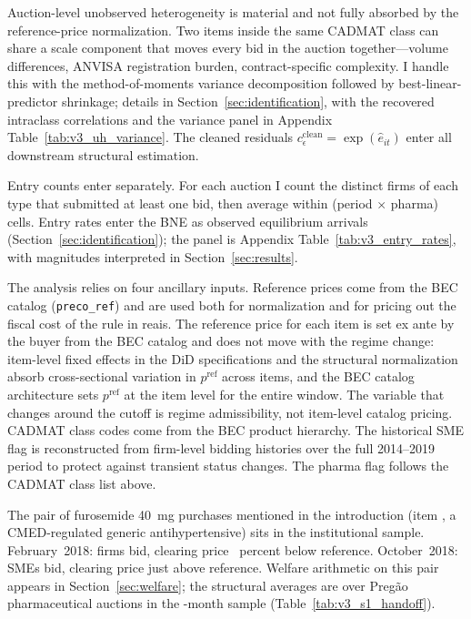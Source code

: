 Auction-level unobserved heterogeneity is material and not fully absorbed by the reference-price normalization. Two items inside the same CADMAT class can share a scale component that moves every bid in the auction together---volume differences, ANVISA registration burden, contract-specific complexity. I handle this with the \citet{krasnokutskaya2011} method-of-moments variance decomposition followed by best-linear-predictor shrinkage; details in Section~\ref{sec:identification}, with the recovered intraclass correlations and the variance panel in Appendix Table~\ref{tab:v3_uh_variance}. The cleaned residuals $c_\epsilon^{\text{clean}} = \exp(\hat e_{it})$ enter all downstream structural estimation.

Entry counts enter separately. For each auction I count the distinct firms of each type that submitted at least one bid, then average within (period $\times$ pharma) cells. Entry rates enter the BNE as observed equilibrium arrivals (Section~\ref{sec:identification}); the panel is Appendix Table~\ref{tab:v3_entry_rates}, with magnitudes interpreted in Section~\ref{sec:results}.

The analysis relies on four ancillary inputs. Reference prices come from the BEC catalog (\texttt{preco\_ref}) and are used both for normalization and for pricing out the fiscal cost of the rule in reais. The reference price for each item is set ex ante by the buyer from the BEC catalog and does not move with the regime change: item-level fixed effects in the DiD specifications and the structural normalization absorb cross-sectional variation in $p^{\mathrm{ref}}$ across items, and the BEC catalog architecture sets $p^{\mathrm{ref}}$ at the item level for the entire window. The variable that changes around the cutoff is regime admissibility, not item-level catalog pricing. CADMAT class codes come from the BEC product hierarchy. The historical SME flag is reconstructed from firm-level bidding histories over the full 2014--2019 period to protect against transient status changes. The pharma flag follows the CADMAT class list above.

The pair of furosemide 40~mg purchases mentioned in the introduction (item \furosItemId, a CMED-regulated generic antihypertensive) sits in the institutional sample. February~2018: \furosBidsFeb{} firms bid, clearing price \furosBelowRefPct{}~percent below reference. October~2018: \furosBidsOct{} SMEs bid, clearing price just above reference. Welfare arithmetic on this pair appears in Section~\ref{sec:welfare}; the structural averages are over \nPharmaPregaoAuc{} Preg\~ao pharmaceutical auctions in the \structuralWindowM-month sample (Table~\ref{tab:v3_s1_handoff}).
